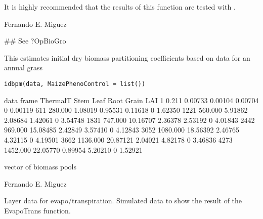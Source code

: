 \documentclass[letterpaper]{book}
\begin{document}
%
\begin{Note}\relax
It is highly recommended that the results of this function
are tested with .
\end{Note}
%
\begin{Author}\relax
Fernando E. Miguez
\end{Author}
%
\begin{SeeAlso}\relax
{}
\end{SeeAlso}
%
\begin{Examples}
\begin{ExampleCode}
## See ?OpBioGro
\end{ExampleCode}
\end{Examples}
%
\begin{Description}\relax
This estimates initial dry biomass partitioning
coefficients based on data for an annual grass
\end{Description}
%
\begin{Usage}
\begin{verbatim}
idbpm(data, MaizePhenoControl = list())
\end{verbatim}
\end{Usage}
%
\begin{Arguments}
\begin{ldescription}
\item[\code{data}] data frame ThermalT Stem Leaf Root Grain LAI
1 0.211 0.00733 0.00104 0.00704 0 0.00119 611 280.000
1.08019 0.95531 0.11618 0 1.62350 1221 560.000 5.91862
2.08684 1.42061 0 3.54748 1831 747.000 10.16707 2.36378
2.53192 0 4.01843 2442 969.000 15.08485 2.42849 3.57410 0
4.12843 3052 1080.000 18.56392 2.46765 4.32115 0 4.19501
3662 1136.000 20.87121 2.04021 4.82178 0 3.46836 4273
1452.000 22.05770 0.89954 5.20210 0 1.52921

\item[\code{MaizePhenoControl}] 
\end{ldescription}
\end{Arguments}
%
\begin{Value}
vector of biomass pools
\end{Value}
%
\begin{Author}\relax
Fernando E. Miguez
\end{Author}
%
\begin{Description}\relax
Layer data for evapo/transpiration. Simulated data to show
the result of the EvapoTrans function.
\end{Description}
\end{document}
